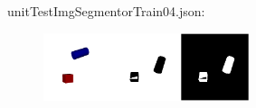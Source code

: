 unitTestImgSegmentorTrain04.json:\\
\begin{scriptsize}
\begin{ttfamily}

\end{ttfamily}
\end{scriptsize}
\begin{center}
\begin{figure}[H]
\centering\includegraphics[width=6cm]{imgSegmentorTest04.png}
\end{figure}
\end{center}
